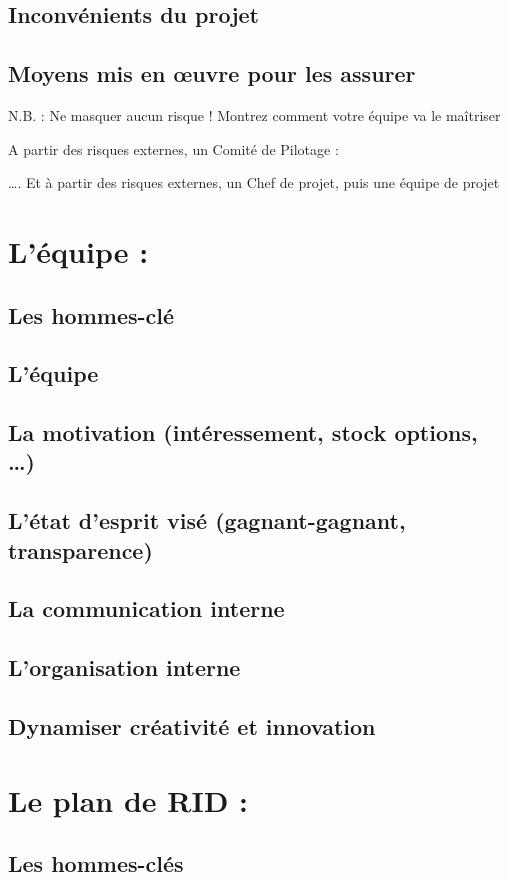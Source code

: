 	\subsection{Inconvénients du projet}
	\subsection{Moyens mis en œuvre pour les assurer}
N.B. : Ne masquer aucun risque ! Montrez comment votre équipe va le maîtriser

A partir des risques externes, un Comité de Pilotage :

…. Et à partir des risques externes, un Chef de projet, puis une équipe de projet 

\section{L'équipe :}
	\subsection{Les hommes-clé}
	\subsection{L'équipe}
	\subsection{La motivation (intéressement, stock options, …)}
	\subsection{L'état d'esprit visé (gagnant-gagnant, transparence)}
	\subsection{La communication interne}
	\subsection{L'organisation interne}
	\subsection{Dynamiser créativité et innovation}

\section{Le plan de RID :}
	\subsection{Les hommes-clés}
